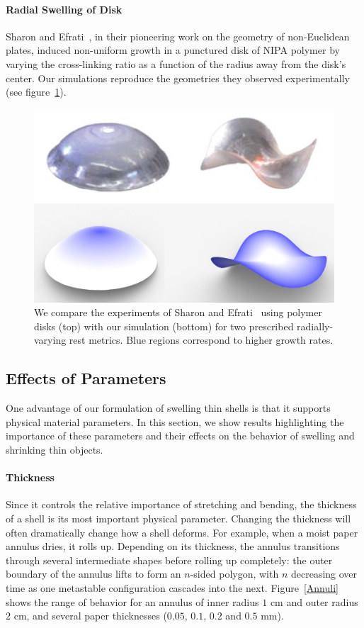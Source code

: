 \documentclass[timestamp,acmtog]{acmart}
\begin{document}
\paragraph{Radial Swelling of Disk}
Sharon and Efrati~, in their pioneering work on the geometry of non-Euclidean plates, induced non-uniform growth in a punctured disk of NIPA polymer by varying the cross-linking ratio as a function of the radius away from the disk's center. Our simulations reproduce the geometries they observed experimentally (see figure~\ref{SwellingDisc}).

\begin{figure}[h]
  \centering
  \includegraphics[width=\linewidth]{SwellingDiscnew.png}
  \caption{We compare the experiments of Sharon and Efrati~ using polymer disks (top) with our simulation (bottom) for two prescribed radially-varying rest metrics. Blue regions correspond to higher growth rates. }
  \setlength{\belowcaptionskip}{-10pt}
  \label{SwellingDisc}
\end{figure}

\subsection{Effects of Parameters}
One advantage of our formulation of swelling thin shells is that it supports physical material parameters. In this section, we show results highlighting the importance of these parameters and their effects on the behavior of swelling and shrinking thin objects.

\paragraph{Thickness}
Since it controls the relative importance of stretching and bending, the thickness of a shell is its most important physical parameter. Changing the thickness will often dramatically change how a shell deforms. For example, when a moist paper annulus dries, it rolls up. Depending on its thickness, the annulus transitions through several intermediate shapes before rolling up completely: the outer boundary of the annulus lifts to form an $n$-sided polygon, with $n$ decreasing over time as one metastable configuration cascades into the next. Figure~\ref{Annuli} shows the range of behavior for an annulus of inner radius $1$ cm and outer radius $2$ cm, and several paper thicknesses ($0.05$, $0.1$, $0.2$ and $0.5$ mm).
\end{document}
